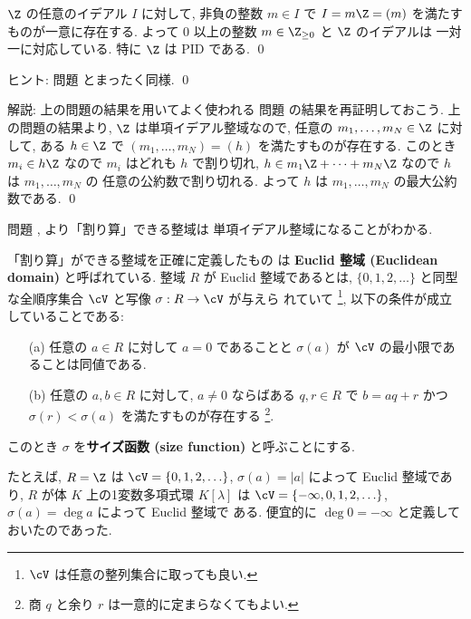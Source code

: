 \documentclass[12pt,twoside]{jarticle}
\begin{document}

\begin{question}[$\Z$ はPID]
\label{q:Z-PID}
  $\Z$ の任意のイデアル $I$ に対して,
  非負の整数 $m\in I$ で $I=m\Z=(m)$ を満たすものが一意に存在する.
  よって $0$ 以上の整数 $m\in\Z_{\ge0}$ と $\Z$ のイデアルは
  一対一に対応している.
  特に $\Z$ は PID である.
  \qed
\end{question}

\noindent
ヒント: 問題  とまったく同様.
\qed

\medskip
\noindent
解説: 上の問題の結果を用いてよく使われる
問題  の結果を再証明しておこう. 
上の問題の結果より, $\Z$ は単項イデアル整域なので, 
任意の $m_1,\dots,m_N\in\Z$ に対して, 
ある $h\in\Z$ で $(m_1,\dots,m_N)=(h)$ を満たすものが存在する.
このとき $m_i\in h\Z$ なので $m_i$ はどれも $h$ で割り切れ,
$h\in m_1\Z+\cdots+m_N\Z$ なので $h$ は $m_1,\dots,m_N$ の
任意の公約数で割り切れる. よって $h$ は $m_1,\dots,m_N$ の最大公約数である.
\qed

\bigskip

問題 ,  より「割り算」できる整域は
単項イデアル整域になることがわかる. 

「割り算」ができる整域を正確に定義したもの
は {\bf Euclid 整域 (Euclidean domain)} と呼ばれている.
整域 $R$ が Euclid 整域であるとは, 
$\{0,1,2,\ldots\}$ と同型な全順序集合 $\cV$ と写像 $\sigma:R\to\cV$ が与えら
れていて%
\footnote{$\cV$ は任意の整列集合に取っても良い.}, 
以下の条件が成立していることである:
\begin{enumerate}
\item[(a)] 任意の $a\in R$ に対して $a=0$ であることと $\sigma(a)$ が $\cV$ 
  の最小限であることは同値である.
\item[(b)] 任意の $a,b\in R$ に対して, $a\ne 0$ ならばある $q,r\in R$ 
  で $b=aq+r$ かつ $\sigma(r)<\sigma(a)$ を満たすものが存在する%
  \footnote{商 $q$ と余り $r$ は一意的に定まらなくてもよい.}.
\end{enumerate}
このとき $\sigma$ を{\bf サイズ函数 (size function)} と呼ぶことにする.

たとえば, $R=\Z$ は $\cV=\{0,1,2,\ldots\}$, $\sigma(a)=|a|$ 
によって Euclid 整域であり, $R$ が体 $K$ 上の1変数多項式環 $K[\lambda]$ 
は $\cV=\{-\infty,0,1,2,\ldots\}$, $\sigma(a)=\deg a$ によって Euclid 整域で
ある. 便宜的に $\deg 0 = -\infty$ と定義しておいたのであった.
\end{document}
